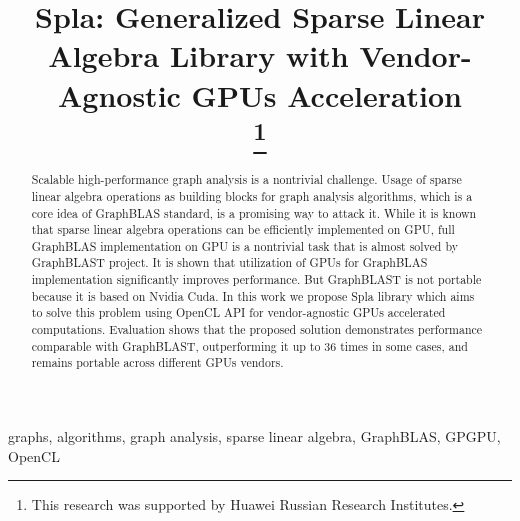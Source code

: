 \documentclass[conference]{IEEEtran}
\begin{document}
\title{Spla: Generalized Sparse Linear Algebra Library with Vendor-Agnostic GPUs Acceleration\\
\thanks{This research was supported by Huawei Russian Research Institutes.}}

\author{
\and
{}
}

\maketitle

\begin{abstract}
    Scalable high-performance graph analysis is a nontrivial challenge. 
    Usage of sparse linear algebra operations as building blocks for graph analysis algorithms, which is a core idea of GraphBLAS standard, is a promising way to attack it.
    While it is known that sparse linear algebra operations can be efficiently implemented on GPU, full GraphBLAS implementation on GPU is a nontrivial task that is almost solved by GraphBLAST project. 
    It is shown that utilization of GPUs for GraphBLAS implementation significantly improves performance. But GraphBLAST is not portable because it is based on Nvidia Cuda.
    In this work we propose Spla library which aims to solve this problem using OpenCL API for vendor-agnostic GPUs accelerated computations.
    Evaluation shows that the proposed solution demonstrates performance comparable with GraphBLAST, outperforming it up to 36 times in some cases, and remains portable across different GPUs vendors.
\end{abstract}

\begin{IEEEkeywords}
graphs, algorithms, graph analysis, sparse linear algebra, GraphBLAS, GPGPU, OpenCL
\end{IEEEkeywords}








\end{document}
